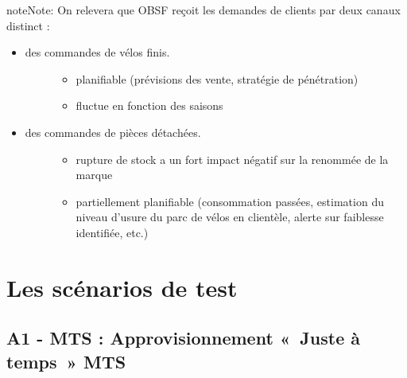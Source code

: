 \documentclass[letterpaper,10pt,french]{sphinxmanual}
\begin{document}
\begin{sphinxadmonition}{note}{Note:}
On relevera que OBSF reçoit les demandes de clients par deux canaux distinct :
\begin{itemize}
\item {} \begin{description}
\item[{des commandes de vélos finis.}] \leavevmode\begin{itemize}
\item {} 
planifiable (prévisions des vente, stratégie de pénétration)

\item {} 
fluctue en fonction des saisons

\end{itemize}

\end{description}

\item {} \begin{description}
\item[{des commandes de pièces détachées.}] \leavevmode\begin{itemize}
\item {} 
rupture de stock a un fort impact négatif sur la renommée de la marque

\item {} 
partiellement planifiable (consommation passées, estimation du niveau d’usure du parc de vélos en clientèle, alerte sur faiblesse identifiée, etc.)

\end{itemize}

\end{description}

\end{itemize}
\end{sphinxadmonition}


\section{Les scénarios de test}
\label{\detokenize{readthedocs/study:les-scenarios-de-test}}

\subsection{A1 - MTS : Approvisionnement « Juste à temps » MTS}
\label{\detokenize{readthedocs/tests/A1_MTS:a1-mts-approvisionnement-juste-a-temps-mts}}\label{\detokenize{readthedocs/tests/A1_MTS::doc}}
\end{document}
